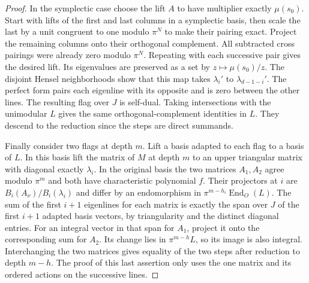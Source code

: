 \documentclass[a4paper,11pt]{article}
\theoremstyle{definition}
\theoremstyle{remark}
\numberwithin{equation}{section}
\begin{document}
\begin{proof}
In the symplectic case choose the lift \(A\) to have multiplier
exactly \(\mu(s_0)\). Start with lifts of the first and last
columns in a symplectic basis, then scale the last by a
unit congruent to one modulo \(\pi^N\) to make their
pairing exact. Project the remaining columns onto their
orthogonal complement. All subtracted cross pairings were
already zero modulo \(\pi^N\). Repeating with each successive
pair gives the desired lift. Its eigenvalues are preserved
as a set by \(z\mapsto\mu(s_0)/z\). The disjoint Hensel
neighborhoods show that this map takes \(\lambda_i'\)
to \(\lambda_{d-1-i}'\). The perfect form pairs each
eigenline with its opposite and is zero between the other
lines. The resulting flag over \(J\) is self-dual. Taking
intersections with the unimodular \(L\) gives the same
orthogonal-complement identities in \(L\). They descend to
the reduction since the steps are direct summands.

Finally consider two flags at depth \(m\). Lift a basis
adapted to each flag to a basis of \(L\). In this basis
lift the matrix of \(M\) at depth \(m\) to an upper triangular
matrix with diagonal exactly \(\lambda_i\). In the original
basis the two matrices \(A_1,A_2\) agree modulo \(\pi^m\)
and both have characteristic polynomial \(f\). Their
projectors at \(i\) are \(B_i(A_\nu)/B_i(\lambda_i)\)
and differ by an endomorphism in
\(\pi^{m-h_i}\operatorname{End}_O(L)\). The sum of the
first \(i+1\) eigenlines for each matrix is exactly the
span over \(J\) of the first \(i+1\) adapted basis vectors,
by triangularity and the distinct diagonal entries. For
an integral vector in that span for \(A_1\), project it
onto the corresponding sum for \(A_2\). Its change lies
in \(\pi^{m-h}L\), so its image is also integral. Interchanging
the two matrices gives equality of the two steps after
reduction to depth \(m-h\). The proof of this last assertion
only uses the one matrix and its ordered actions on the
successive lines.
\end{proof}
\end{document}
